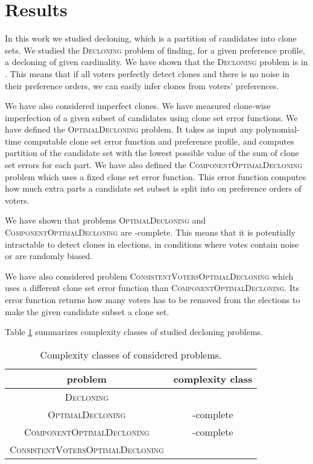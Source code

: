 \section{Results}

In this work we studied decloning, which is a partition of candidates into clone sets.
We studied the \textsc{Decloning} problem of finding,
for a given preference profile, a decloning of given cardinality.
We have shown that the \textsc{Decloning} problem is in \p.
This means that if all voters perfectly detect clones
and there is no noise in their preference orders,
we can easily infer clones from voters' preferences.

We have also considered imperfect clones.
We have measured clone-wise imperfection of a given subset of candidates using clone set error functions.
We have defined the \textsc{OptimalDecloning} problem.
It takes as input any polynomial-time computable clone set error function and preference profile,
and computes partition of the candidate set with the lowest possible value of the sum of clone set errors for each part.
We have also defined the \textsc{ComponentOptimalDecloning} problem which uses a fixed clone set error function.
This error function computes how much extra parts a candidate set subset is split into
on preference orders of voters.

We have shown that problems \textsc{OptimalDecloning} and \textsc{ComponentOptimalDecloning}
are \np-complete.
This means that it is potentially intractable to detect clones in elections,
in conditions where votes contain noise or are randomly biased.

We have also considered problem \textsc{ConsistentVotersOptimalDecloning}
which uses a different clone set error function than \textsc{ComponentOptimalDecloning}.
Its error function returns how many voters has to be removed from the elections
to make the given candidate subset a clone set.

Table \ref{cclasses} summarizes complexity classes of studied decloning problems.

\begin{table}
\centering
\begin{tabular}{| c | c |}\hline
	\textbf{problem} & \textbf{complexity class} \\ \hline
	\textsc{Decloning} & \p \\ \hline
	\textsc{OptimalDecloning} & \np-complete \\ \hline
	\textsc{ComponentOptimalDecloning} & \np-complete \\ \hline
	\textsc{ConsistentVotersOptimalDecloning} & \np \\ \hline
\end{tabular}
\caption{Complexity classes of considered problems.} \label{cclasses}
\end{table}


